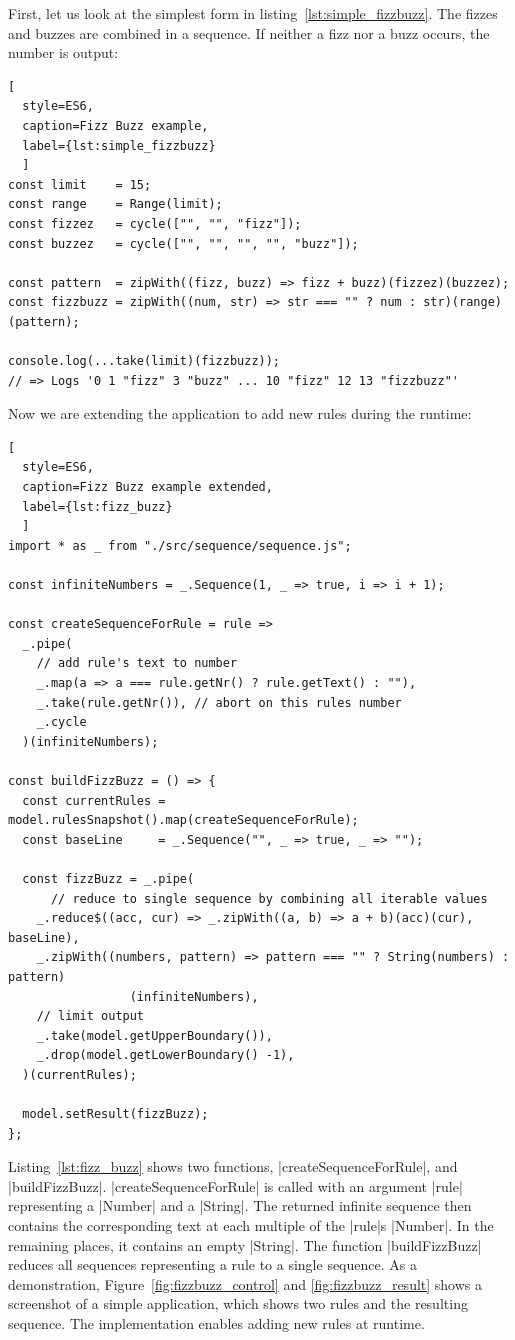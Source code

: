 First, let us look at the simplest form in listing~\ref{lst:simple_fizzbuzz}. 
The fizzes and buzzes are combined in a
sequence. If neither a fizz nor a buzz occurs, the number is output:

\begin{lstlisting}[
  style=ES6, 
  caption=Fizz Buzz example,
  label={lst:simple_fizzbuzz}
  ]
const limit    = 15;
const range    = Range(limit);
const fizzez   = cycle(["", "", "fizz"]);
const buzzez   = cycle(["", "", "", "", "buzz"]);

const pattern  = zipWith((fizz, buzz) => fizz + buzz)(fizzez)(buzzez);
const fizzbuzz = zipWith((num, str) => str === "" ? num : str)(range)(pattern);

console.log(...take(limit)(fizzbuzz));
// => Logs '0 1 "fizz" 3 "buzz" ... 10 "fizz" 12 13 "fizzbuzz"'
\end{lstlisting}

Now we are extending the application to add new rules during the runtime:

\begin{lstlisting}[
  style=ES6, 
  caption=Fizz Buzz example extended,
  label={lst:fizz_buzz}
  ]
import * as _ from "./src/sequence/sequence.js";

const infiniteNumbers = _.Sequence(1, _ => true, i => i + 1);

const createSequenceForRule = rule =>
  _.pipe(
    // add rule's text to number
    _.map(a => a === rule.getNr() ? rule.getText() : ""),     
    _.take(rule.getNr()), // abort on this rules number
    _.cycle
  )(infiniteNumbers);

const buildFizzBuzz = () => {
  const currentRules = model.rulesSnapshot().map(createSequenceForRule);
  const baseLine     = _.Sequence("", _ => true, _ => "");

  const fizzBuzz = _.pipe(
      // reduce to single sequence by combining all iterable values
    _.reduce$((acc, cur) => _.zipWith((a, b) => a + b)(acc)(cur), baseLine), 
    _.zipWith((numbers, pattern) => pattern === "" ? String(numbers) : pattern)
                 (infiniteNumbers), 
    // limit output
    _.take(model.getUpperBoundary()),
    _.drop(model.getLowerBoundary() -1),
  )(currentRules);

  model.setResult(fizzBuzz);
};
\end{lstlisting}
Listing~\ref{lst:fizz_buzz} shows two functions, |createSequenceForRule|, and
|buildFizzBuzz|. 
|createSequenceForRule| is called with an argument |rule| representing a
|Number| and a |String|. The returned infinite sequence then contains the
corresponding text at each multiple of the |rule|s |Number|. In the remaining places, it
contains an empty |String|. The function |buildFizzBuzz| reduces all sequences
representing a rule to a single sequence. As a demonstration,
Figure~\ref{fig:fizzbuzz_control} and \ref{fig:fizzbuzz_result} shows a
screenshot of a simple application, which shows two rules and the resulting
sequence. The implementation enables adding new rules at runtime. 

